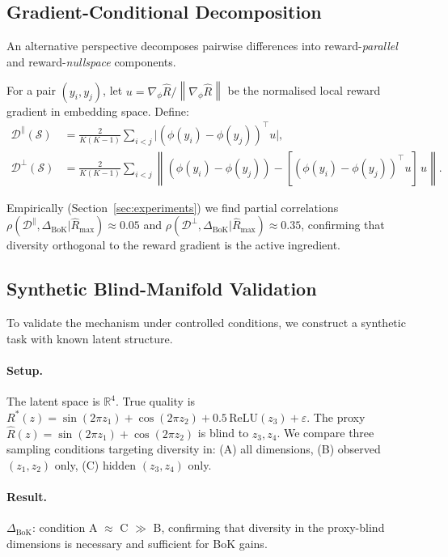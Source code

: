 \documentclass{article}
\newcommand{\R}{\mathbb{R}}
\newcommand{\cS}{\mathcal{S}}
\newcommand{\Rhat}{\hat{R}}
\newcommand{\Rstar}{R^{*}}
\newcommand{\DeltaBoK}{\Delta_{\mathrm{BoK}}}
\newcommand{\norm}[1]{\left\|#1\right\|}
\begin{document}
\subsection{Gradient-Conditional Decomposition}
\label{sec:gradient}

An alternative perspective decomposes pairwise differences into
reward-\emph{parallel} and reward-\emph{nullspace} components.

For a pair $(y_i, y_j)$, let $u = \nabla_\phi \Rhat / \norm{\nabla_\phi\Rhat}$
be the normalised local reward gradient in embedding space.  Define:
\begin{align*}
  \mathcal{D}^\parallel(\cS) &= \tfrac{2}{K(K-1)}\!\sum_{i<j}
    \bigl|(\phi(y_i)-\phi(y_j))^\top u\bigr|,\\
  \mathcal{D}^\perp(\cS)     &= \tfrac{2}{K(K-1)}\!\sum_{i<j}
    \norm{(\phi(y_i)-\phi(y_j)) - [(\phi(y_i)-\phi(y_j))^\top u]\,u}.
\end{align*}

Empirically (Section~\ref{sec:experiments}) we find partial correlations
$\rho(\mathcal{D}^\parallel, \DeltaBoK|\Rhat_{\max}) \approx 0.05$ and
$\rho(\mathcal{D}^\perp, \DeltaBoK|\Rhat_{\max}) \approx 0.35$,
confirming that diversity orthogonal to the reward gradient is the active
ingredient.

\subsection{Synthetic Blind-Manifold Validation}
\label{sec:synthetic}

To validate the mechanism under controlled conditions, we construct a synthetic
task with known latent structure.

\paragraph{Setup.}
The latent space is $\R^4$.  True quality is
$\Rstar(z) = \sin(2\pi z_1) + \cos(2\pi z_2) + 0.5\,\mathrm{ReLU}(z_3) + \varepsilon$.
The proxy $\Rhat(z) = \sin(2\pi z_1) + \cos(2\pi z_2)$ is blind to $z_3, z_4$.
We compare three sampling conditions targeting diversity in: (A) all dimensions,
(B) observed $(z_1,z_2)$ only, (C) hidden $(z_3,z_4)$ only.

\paragraph{Result.}
$\DeltaBoK$: condition A $\approx$ C $\gg$ B, confirming that diversity in the
proxy-blind dimensions is necessary and sufficient for BoK gains.
\end{document}
